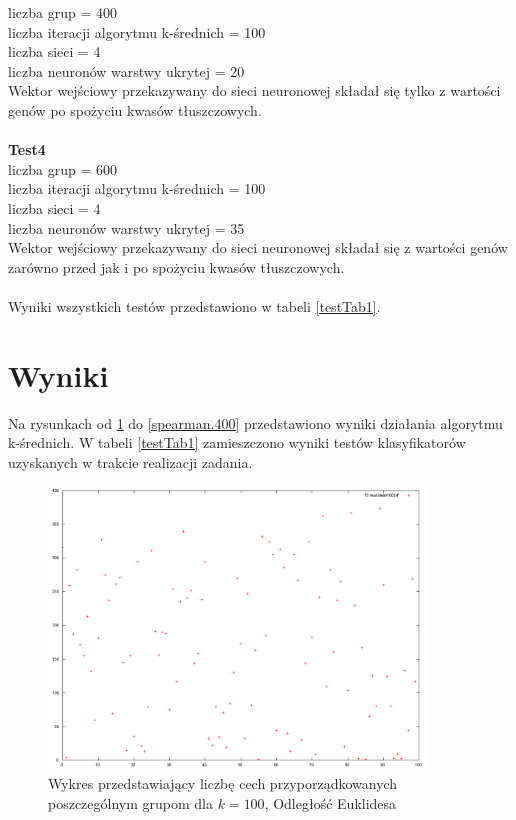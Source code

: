 \documentclass{classrep}
\begin{document}
liczba grup = 400\\
liczba iteracji algorytmu k-średnich = 100\\
liczba sieci = 4\\
liczba neuronów warstwy ukrytej = 20\\
Wektor wejściowy przekazywany do sieci neuronowej składał się tylko z wartości genów po spożyciu kwasów tłuszczowych.\\\\
\textbf{Test4}\\
liczba grup = 600\\
liczba iteracji algorytmu k-średnich = 100\\
liczba sieci = 4\\
liczba neuronów warstwy ukrytej = 35\\
Wektor wejściowy przekazywany do sieci neuronowej składał się z wartości genów zarówno przed jak i po spożyciu kwasów tłuszczowych.\\\\
Wyniki wszystkich testów przedstawiono w tabeli \ref{testTab1}.

\section{Wyniki}
Na rysunkach od \ref{euclidean.100} do \ref{spearman.400} przedstawiono wyniki działania algorytmu k-średnich. W tabeli \ref{testTab1} zamieszczono wyniki testów klasyfikatorów uzyskanych w trakcie realizacji zadania.
\begin{figure}
  \centering
  \includegraphics[width=10cm]{img/euclidean100.png}
  \caption{Wykres przedstawiający liczbę cech przyporządkowanych poszczególnym
grupom dla $k=100$, Odległość Euklidesa}
  \label{euclidean.100}
\end{figure}
\end{document}
